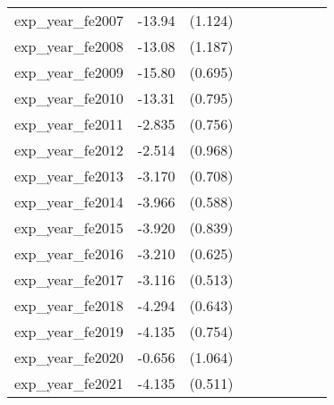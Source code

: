 {\begin{tabular}{l*{4}{cc}}
exp\_year\_fe2007&   -13.94\sym{***}&  (1.124)&                  &         &                  &         &                  &         \\
exp\_year\_fe2008&   -13.08\sym{***}&  (1.187)&                  &         &                  &         &                  &         \\
exp\_year\_fe2009&   -15.80\sym{***}&  (0.695)&                  &         &                  &         &                  &         \\
exp\_year\_fe2010&   -13.31\sym{***}&  (0.795)&                  &         &                  &         &                  &         \\
exp\_year\_fe2011&   -2.835\sym{***}&  (0.756)&                  &         &                  &         &                  &         \\
exp\_year\_fe2012&   -2.514\sym{**} &  (0.968)&                  &         &                  &         &                  &         \\
exp\_year\_fe2013&   -3.170\sym{***}&  (0.708)&                  &         &                  &         &                  &         \\
exp\_year\_fe2014&   -3.966\sym{***}&  (0.588)&                  &         &                  &         &                  &         \\
exp\_year\_fe2015&   -3.920\sym{***}&  (0.839)&                  &         &                  &         &                  &         \\
exp\_year\_fe2016&   -3.210\sym{***}&  (0.625)&                  &         &                  &         &                  &         \\
exp\_year\_fe2017&   -3.116\sym{***}&  (0.513)&                  &         &                  &         &                  &         \\
exp\_year\_fe2018&   -4.294\sym{***}&  (0.643)&                  &         &                  &         &                  &         \\
exp\_year\_fe2019&   -4.135\sym{***}&  (0.754)&                  &         &                  &         &                  &         \\
exp\_year\_fe2020&   -0.656         &  (1.064)&                  &         &                  &         &                  &         \\
exp\_year\_fe2021&   -4.135\sym{***}&  (0.511)&                  &         &                  &         &                  &         \\

\end{tabular}}
